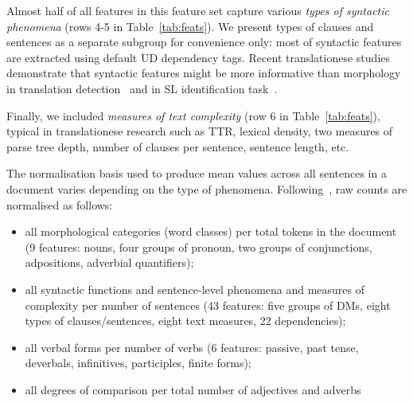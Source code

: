 Almost half of all features in this feature set capture various \textit{types of syntactic phenomena} (rows 4-5 in Table~\ref{tab:feats}). We present types of clauses and sentences as a separate subgroup for convenience only: most of syntactic features are extracted using default UD dependency tags. Recent translationese studies demonstrate that syntactic features might be more informative than morphology in translation detection~\cite{Hu2021} and in SL identification task~\cite{Chowdhury2020}.  

Finally, we included \textit{measures of text complexity} (row 6 in Table~\ref{tab:feats}), typical in translationese research such as \gls{TTR}, lexical density, two measures of parse tree depth, number of clauses per sentence, sentence length, etc. 

The normalisation basis used to produce mean values across all sentences in a document varies depending on the type of phenomena. Following~\citet{Evert2017}, raw counts are normalised as follows:
\begin{itemize}
	\item all morphological categories (word classes) per total tokens in the document (9 features: nouns, four groups of pronoun, two groups of conjunctions, adpositions, adverbial quantifiers);
	\item all syntactic functions and sentence-level phenomena and measures of complexity per number of sentences (43 features: five groups of DMs, eight types of clauses/sentences, eight text measures, 22 dependencies);
	\item all verbal forms per number of verbs (6 features: passive, past tense, deverbals, infinitives, participles, finite forms);
	\item all degrees of comparison per total number of adjectives and adverbs
\end{itemize}

